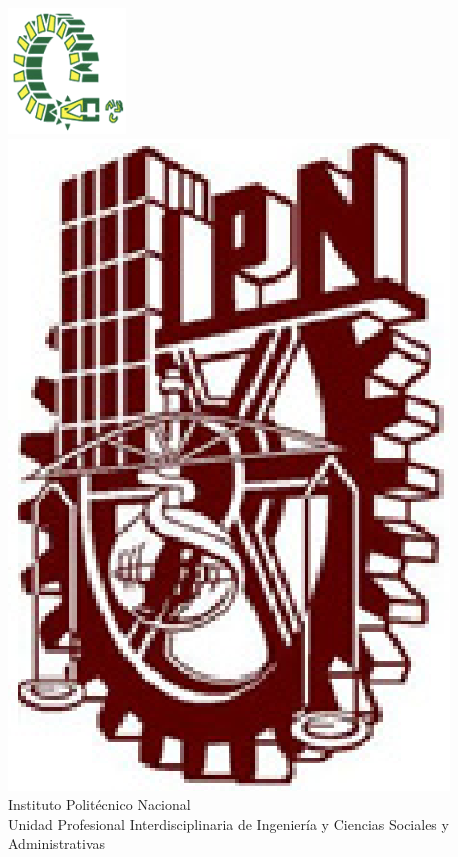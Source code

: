 \begin{titlepage}

    \centering %

    	\includegraphics[scale=1.2]{imagenes/upiicsa} %
    	\quad
    	\includegraphics[scale=0.15]{imagenes/ipn} %
    	\LARGE{\\ Instituto Polit\'ecnico Nacional} %
    	\LARGE{\\ Unidad Profesional Interdisciplinaria de Ingeniería y Ciencias Sociales y Administrativas} %


\end{titlepage}
